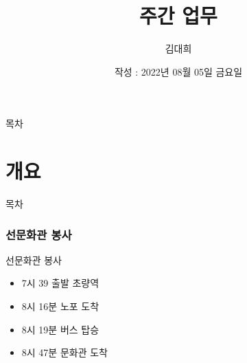 \documentclass[aspectratio=1610,17pt,xcolor=pdftex,dvipsnames,table,handout]{beamer}
\begin{document}
	

			\title{주간 업무 }

			\author{김대희}

			\date{ 작성 : 2022년 	08월 05일 금요일 }



		\begin{frame}[plain]
		\titlepage
		\end{frame}



		\begin{frame} {목차}
		\tableofcontents
		\end{frame}

		\part{개요 }
		\frame{\partpage}


		\begin{frame} [plain]{목차}
		\tableofcontents
		\end{frame}
		

		\section{선문화관 봉사 }
		

		\begin{frame} [t,plain]
			\begin{block} {선문화관 봉사 }
			\begin{itemize}
				\item 7시 39 출발 초량역
				\item 8시 16분 노포 도착
				\item 8시 19분 버스 탑승
				\item 8시 47분 문화관 도착
			\end{itemize}
			\end{block}
		\end{frame}
\end{document}
